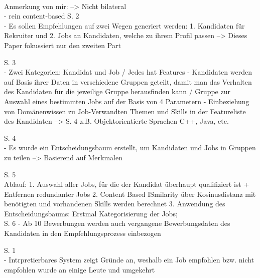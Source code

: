 \textcite{applyingDataMining:2014}\\
Anmerkung von mir: --> Nicht bilateral\\
- rein content-based
S. 2\\
- Es sollen Empfehlungen auf zwei Wegen generiert werden: 1. Kandidaten für Rekruiter und 2. Jobs an Kandidaten, welche zu ihrem Profil passen --> Dieses Paper fokussiert nur den zweiten Part

S. 3\\
- Zwei Kategorien: Kandidat und Job / Jedes hat Features
- Kandidaten werden auf Basis ihrer Daten in verschiedene Gruppen geteilt, damit man das Verhalten des Kandidaten für die jeweilige Gruppe herausfinden kann / Gruppe zur Auswahl eines bestimmten Jobs auf der Basis von 4 Parametern
- Einbeziehung von Domänenwissen zu Job-Verwandten Themen und Skills in der Featureliste des Kandidaten --> S. 4 z.B. Objektorientierte Sprachen C++, Java, etc.

S. 4\\
- Es wurde ein Entscheidungsbaum erstellt, um Kandidaten und Jobs in Gruppen zu teilen --> Basierend auf Merkmalen

S. 5\\
Ablauf:
1. Auswahl aller Jobs, für die der Kandidat überhaupt qualifiziert ist + Entfernen redundanter Jobs
2. Content Based ISmilarity über Kosinusdistanz mit benötigten und vorhandenen Skills werden berechnet
3. Anwendung des Entscheidungsbaums: Erstmal Kategorisierung der Jobs; \\

S. 6
- Ab 10 Bewerbungen werden auch vergangene Bewerbungsdaten des Kandidaten in den Empfehlungsprozess einbezogen

\textcite{le:2019}
S. 1\\
- Intrpretierbares System zeigt Gründe an, weshalb ein Job empfohlen bzw. nicht empfohlen wurde an einige Leute und umgekehrt

